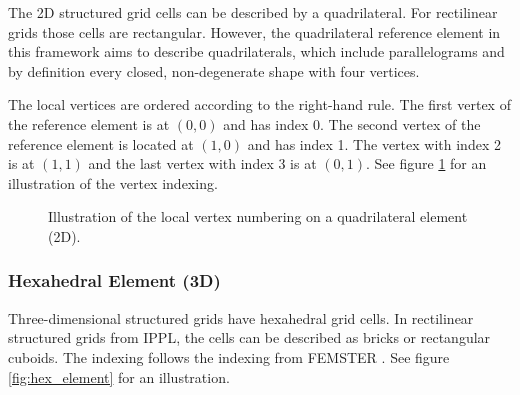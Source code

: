 The 2D structured grid cells can be described by a quadrilateral. For rectilinear grids
those cells are rectangular.
However, the quadrilateral reference element in this framework aims to describe quadrilaterals,
which include parallelograms and by definition every closed, non-degenerate shape with four vertices.

The local vertices are ordered according to the right-hand rule.
The first vertex of the reference element is at $(0,0)$ and has index 0.
The second vertex of the reference element is located at $(1,0)$ and has index 1.
The vertex with index 2 is at $(1, 1)$ and the last vertex with index 3 is at $(0,1)$.
See figure \ref{fig:quad_element} for an illustration of the vertex indexing.

\begin{figure}[h]
    \centering
    \caption{Illustration of the local vertex numbering on a quadrilateral element (2D).}
    \label{fig:quad_element}
\end{figure}

\subsubsection{Hexahedral Element (3D)}

Three-dimensional structured grids have hexahedral grid cells.
In rectilinear structured grids from IPPL, the cells can be described as bricks or rectangular cuboids.
The indexing follows the indexing from FEMSTER \cite{castillo_femster_2005}.
See figure \ref{fig:hex_element} for an illustration.


